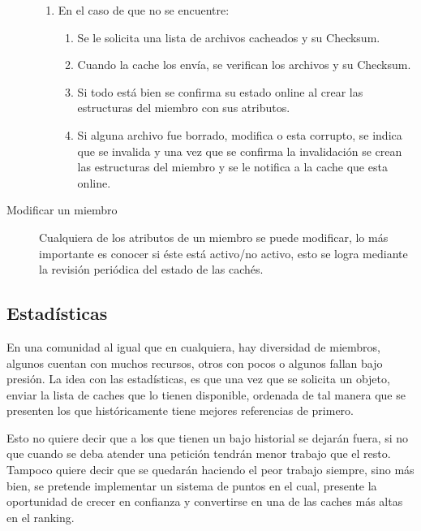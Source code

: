 \begin{description}
\begin{enumerate}
	\item En el caso de que no se encuentre:
		\begin{enumerate}
		\item Se le solicita una lista de archivos cacheados y su Checksum.
		\item Cuando la cache los envía, se verifican los archivos y su Checksum.
		\item Si todo está bien se confirma su estado online al crear las estructuras del miembro con sus atributos.
		\item Si alguna archivo fue borrado, modifica o esta corrupto, se indica que se invalida y una vez que se confirma la invalidación se crean las estructuras del miembro y se le notifica a la cache que esta online.
		\end{enumerate}	
	
	\end{enumerate}
	
\item [Modificar un miembro] Cualquiera de los atributos de un miembro se puede modificar, lo más importante es conocer si éste está activo/no activo, esto se logra mediante la  revisión periódica del estado de las cachés.

\end{description}


\subsection{Estadísticas}

En una comunidad al igual que en cualquiera, hay diversidad de miembros, algunos cuentan con muchos recursos, otros con pocos o algunos fallan bajo presión. La idea con las estadísticas, es que una vez que se solicita un objeto, enviar la lista de caches que lo tienen disponible, ordenada de tal manera que se presenten los que históricamente tiene mejores referencias de primero. 

Esto no quiere decir que a los que tienen un bajo historial se dejarán fuera, si no que cuando se deba atender una petición tendrán menor trabajo que el resto. Tampoco quiere decir que se quedarán haciendo el peor trabajo siempre, sino más bien, se pretende implementar un sistema de puntos en el cual, presente la oportunidad de crecer en confianza y convertirse en una de las caches más altas en el ranking.


